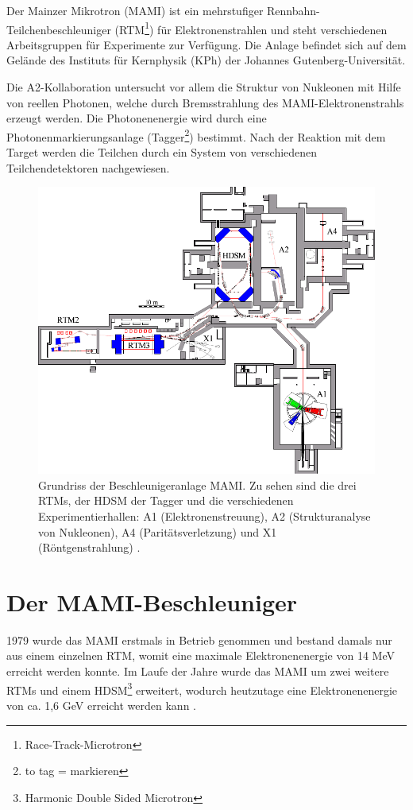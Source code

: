 \documentclass[a4paper,11pt,oneside,final,german,openbib,pdftex]{scrbook}
\begin{document}
{Der Mainzer Mikrotron (MAMI) ist ein mehrstufiger Rennbahn-Teilchenbeschleuniger (RTM\footnote{Race-Track-Microtron}) für Elektronenstrahlen und steht verschiedenen Arbeitsgruppen für Experimente zur Verfügung. Die Anlage befindet sich auf dem Gelände des Instituts für Kernphysik (KPh) der Johannes Gutenberg-Universität.

Die A2-Kollaboration untersucht vor allem die Struktur von Nukleonen mit Hilfe von reellen Photonen, welche durch Bremsstrahlung des MAMI-Elektronenstrahls erzeugt werden. Die Photonenenergie wird durch eine Photonenmarkierungsanlage (Tagger\footnote{to tag = markieren}) bestimmt. Nach der Reaktion mit dem Target werden die Teilchen durch ein System von verschiedenen Teilchendetektoren nachgewiesen.

\begin{figure}[h!]
	
	\includegraphics{grundriss}
	\caption[Grundriss der MAMI-Anlage]{Grundriss der Beschleunigeranlage MAMI. Zu sehen sind die drei RTMs, der HDSM der Tagger und die verschiedenen Experimentierhallen: A1 (Elektronenstreuung), A2 (Strukturanalyse von Nukleonen), A4 (Parit\"atsverletzung) und X1 (R\"ontgenstrahlung) \cite{KPh07}.}
	\label{fig.grundriss_anlage}
\end{figure}


\section{Der MAMI-Beschleuniger}
1979 wurde das MAMI erstmals in Betrieb genommen und bestand damals nur aus einem einzelnen RTM, womit eine maximale Elektronenenergie von 14 MeV erreicht werden konnte. 
Im Laufe der Jahre wurde das MAMI um zwei weitere RTMs und einem HDSM\footnote{Harmonic Double Sided Microtron} erweitert, wodurch heutzutage eine Elektronenenergie von ca. 1,6 GeV erreicht werden kann \cite{KPh11G}. 
\newline


}
\end{document}
